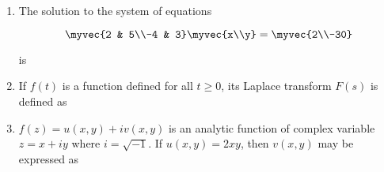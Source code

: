 \documentclass[journal,11pt,onecolumn]{IEEEtran}
\begin{document}
\begin{enumerate}

    \item The solution to the system of equations

          \[
              \myvec{2 & 5\\-4 & 3}\myvec{x\\y}=\myvec{2\\-30}
          \]

          is

          \begin{enumerate}

          \end{enumerate}

    \item If $f(t)$ is a function defined for all $t \geq 0$, its Laplace transform $F(s)$ is defined as

          \begin{enumerate}


          \end{enumerate}

    \item $f(z) = u(x,y) + iv(x,y)$ is an analytic function of complex variable $z = x + iy$ where $i = \sqrt{-1}$. If $u(x,y) = 2xy$, then $v(x,y)$ may be expressed as


\end{enumerate}
\end{document}

